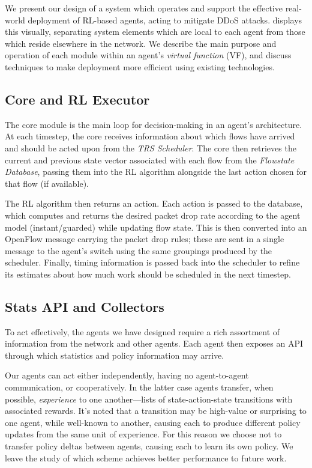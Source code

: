 \documentclass[10pt, times, conference, letterpaper]{IEEEtran}
\begin{document}
We present our design of a system which operates and support the effective real-world deployment of RL-based agents, acting to mitigate DDoS attacks.
 displays this visually, separating system elements which are local to each agent from those which reside elsewhere in the network.
We describe the main purpose and operation of each module within an agent's \emph{virtual function} (VF), and discuss techniques to make deployment more efficient using existing technologies.

\subsection{Core and RL Executor}
The core module is the main loop for decision-making in an agent's architecture.
At each timestep, the core receives information about which flows have arrived and should be acted upon from the \emph{TRS Scheduler}.
The core then retrieves the current and previous state vector associated with each flow from the \emph{Flowstate Database}, passing them into the RL algorithm alongside the last action chosen for that flow (if available).

The RL algorithm then returns an action.
Each action is passed to the database, which computes and returns the desired packet drop rate according to the agent model (instant/guarded) while updating flow state.
This is then converted into an OpenFlow message carrying the packet drop rules; these are sent in a single message to the agent's switch using the same groupings produced by the scheduler.
Finally, timing information is passed back into the scheduler to refine its estimates about how much work should be scheduled in the next timestep.

\subsection{Stats API and Collectors}
To act effectively, the agents we have designed require a rich assortment of information from the network and other agents.
Each agent then exposes an API through which statistics and policy information may arrive.

Our agents can act either independently, having no agent-to-agent communication, or cooperatively.
In the latter case agents transfer, when possible, \emph{experience} to one another---lists of state-action-state transitions with associated rewards.
It's noted that a transition may be high-value or surprising to one agent, while well-known to another, causing each to produce different policy updates from the same unit of experience.
For this reason we choose not to transfer policy deltas between agents, causing each to learn its own policy.
We leave the study of which scheme achieves better performance to future work.
\end{document}
